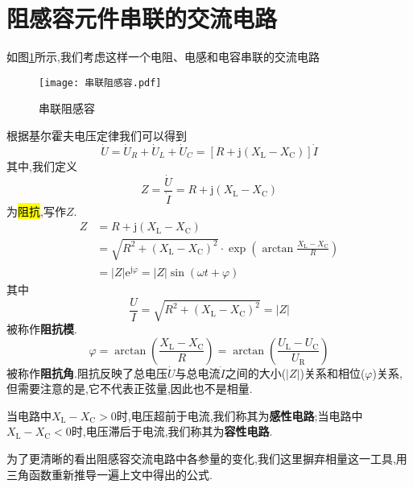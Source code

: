 \section{\K 阻感容元件串联的交流电路}
\Par 如图\ref{fig:串联阻感容}所示,我们考虑这样一个电阻、电感和电容串联的交流电路
\begin{figure}[htbp]
	\centering
	\texttt{[image: 串联阻感容.pdf]}
	\caption{串联阻感容}
	\label{fig:串联阻感容}
\end{figure}

\Par 根据基尔霍夫电压定律我们可以得到
\begin{equation*}
    \dot{U}=\dot{U}_R+\dot{U}_L+\dot{U}_C=\left[ R+\mathrm{j}\left( X_{\mathrm{L}}-X_{\mathrm{C}} \right) \right] \dot{I}
\end{equation*}
其中,我们定义
\begin{equation}
    Z=\frac{\dot{U}}{\dot{I}}=R+\mathrm{j}\left( X_{\mathrm{L}}-X_{\mathrm{C}} \right) 
\end{equation}
为\hl{阻抗},写作$Z$.
\begin{align*}
	Z&=R+\mathrm{j}\left( X_{\mathrm{L}}-X_{\mathrm{C}} \right)\nonumber \\
	&=\sqrt{R^2+\left( X_{\mathrm{L}}-X_{\mathrm{C}} \right) ^2}\cdot \exp \left( \arctan \frac{X_{\mathrm{L}}-X_{\mathrm{C}}}{R} \right)\nonumber \\
	&=\left| Z \right|\mathrm{e}^{\mathrm{j}\varphi}=\left| Z \right|\sin \left( \omega t+\varphi \right) 
\end{align*}
其中
\begin{equation}
    \frac{U}{I}=\sqrt{R^2+\left( X_{\mathrm{L}}-X_{\mathrm{C}} \right) ^2}=\left| Z \right|
\end{equation}
被称作\textbf{阻抗模}.
\begin{equation}
    \varphi =\arctan \left( \frac{X_{\mathrm{L}}-X_{\mathrm{C}}}{R} \right) =\arctan \left( \frac{U_{\mathrm{L}}-U_{\mathrm{C}}}{U_{\mathrm{R}}} \right) 
\end{equation}
被称作\textbf{阻抗角}.阻抗反映了总电压$\dot{U}$与总电流$\dot{I}$之间的大小($\left| Z \right|$)关系和相位($\varphi$)关系,但需要注意的是,它不代表正弦量,因此也不是相量.

\Par 当电路中$X_{\mathrm{L}}-X_{\mathrm{C}}>0$时,电压超前于电流,我们称其为\textbf{感性电路};当电路中$X_{\mathrm{L}}-X_{\mathrm{C}}<0$时,电压滞后于电流,我们称其为\textbf{容性电路}.

\Par 为了更清晰的看出阻感容交流电路中各参量的变化,我们这里摒弃相量这一工具,用三角函数重新推导一遍上文中得出的公式.

